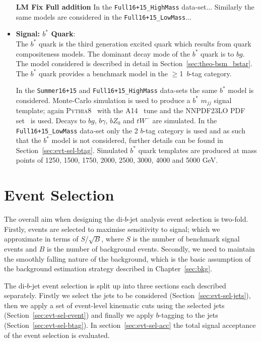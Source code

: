 \begin{itemize}[leftmargin=*]
  \textbf{LM Fix Full addition}
  In the \verb|Full16+15_HighMass| data-set...
  Similarly the same models are considered in the \verb|Full16+15_LowMass|... \\

\item\textbf{Signal: $b^*$ Quark}: \\
  The $b^*$ quark is the third generation excited quark which results from
  quark compositeness models.
  The dominant decay mode of the  $b^*$ quark is to $bg$.
  The model considered is
  described in detail in Section~\ref{sec:theo-bsm_bstar}.
  The $b^*$ quark provides a benchmark model in the $\geq$1~$b$-tag category.
    
  
  In the \verb|Summer16+15| and \verb|Full16+15_HighMass|
  data-sets the same $b^*$ model is considered.
  Monte-Carlo simulation is used to produce a $b^*$ $m_{jj}$ signal template;
  again \textsc{Pythia8}~\cite{dibjet-pythia8} with the A14~\cite{dibjet-a14} tune and the NNPDF23LO PDF set~\cite{dibjet-nnpdf} is used.
  Decays to $bg$, $b\gamma$, $bZ_0$ and $tW^{-}$ are simulated.
  In the \verb|Full16+15_LowMass| data-set
  only the 2 $b$-tag category is used
  and as such that the $b^*$ model is not considered,
  further details can be found in Section~\ref{sec:evt-sel-btag}.
  Simulated $b^*$ quark templates are produced at mass points of
  1250, 1500, 1750, 2000, 2500, 3000, 4000 and 5000 GeV.
\end{itemize}

\section{Event Selection}
\label{sec:evt-sel}

The overall aim when designing the di-$b$-jet analysis event selection
is two-fold.
Firstly, events are selected to
maximise sensitivity to signal;
which we approximate in terms of $S$/$\sqrt{B}$,
where $S$ is the number of benchmark signal events and $B$ is the number of background events.
Secondly, we need to maintain the smoothly falling nature of the background,
which is the basic assumption of the background estimation strategy
described in Chapter~\ref{sec:bkg}.

The di-$b$-jet event selection is split up into three sections each described separately.
Firstly we select the jets to be considered (Section~\ref{sec:evt-sel-jets}),
then we apply a set of event-level kinematic cuts using the selected jets (Section~\ref{sec:evt-sel-event})
and finally we apply $b$-tagging to the jets (Section~\ref{sec:evt-sel-btag}).
In section~\ref{sec:evt-sel-acc} the total signal acceptance of the
event selection is evaluated.

